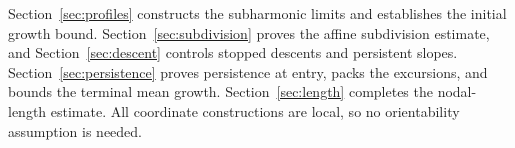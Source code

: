 Section~\ref{sec:profiles} constructs the subharmonic limits and
establishes the initial growth bound. Section~\ref{sec:subdivision}
proves the affine subdivision estimate, and
Section~\ref{sec:descent} controls stopped descents and persistent
slopes. Section~\ref{sec:persistence} proves persistence at entry,
packs the excursions, and bounds the terminal mean growth.
Section~\ref{sec:length} completes the nodal-length estimate.
All coordinate constructions are local, so no orientability
assumption is needed.
